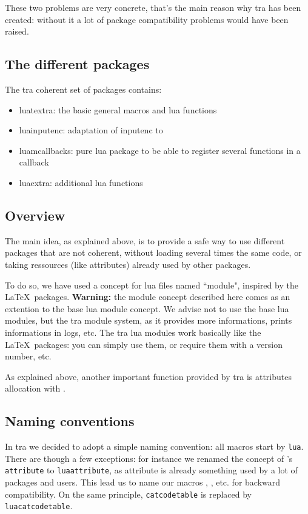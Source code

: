 \documentclass{article}
\begin{document}
These two problems are very concrete, that's the main reason why \LuaTeX tra has been created: without it a lot of package compatibility problems would have been raised.

\subsection{The different packages}

The \LuaTeX tra coherent set of packages contains:

\begin{itemize}
\item \textsf{luatextra}: the basic general macros and lua functions
\item \textsf{luainputenc}: adaptation of \textsf{inputenc} to \LuaTeX
\item \textsf{luamcallbacks}: pure lua package to be able to register several functions in a callback
\item \textsf{luaextra}: additional lua functions
\end{itemize}

\subsection{Overview}

The main idea, as explained above, is to provide a safe way to use different packages that are not coherent, without loading several times the same code, or taking ressources (like attributes) already used by other packages.

To do so, we have used a concept for lua files named ``module", inspired by the \LaTeX\ packages. \textbf{Warning:} the module concept described here comes as an extention to the base lua module concept. We advise not to use the base lua modules, but the \LuaTeX tra module system, as it provides more informations, prints informations in logs, etc. The \LuaTeX tra lua modules work basically like the \LaTeX\ packages: you can simply use them, or require them with a version number, etc.

As explained above, another important function provided by \LuaTeX tra is attributes allocation with \texttt{\string\newluaattribute}.

\subsection{Naming conventions}

In \LuaTeX tra we decided to adopt a simple naming convention: all macros start by \texttt{lua}. There are though a few exceptions: for instance we renamed the concept of \LuaTeX 's \texttt{attribute} to \texttt{luaattribute}, as attribute is already something used by a lot of packages and users. This lead us to name our macros \texttt{\string\newluaattribute}, \texttt{\string\unsetluaattribute}, etc. for backward compatibility. On the same principle, \texttt{catcodetable} is replaced by \texttt{luacatcodetable}.
\end{document}
